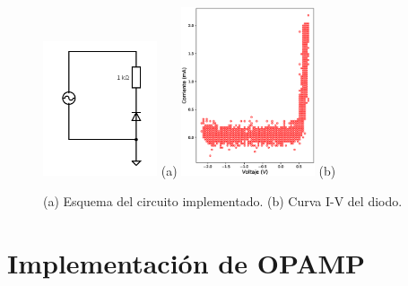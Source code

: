 \documentclass[a4paper,10pt]{article}
\begin{document}
\begin{figure}
 \centering
 \includegraphics[trim={0 0 1cm 0},clip, width=0.3\textwidth]{circuit.png} (a)
 \hspace{0.1cm}
 \includegraphics[width=0.35\textwidth]{diodo.eps} (b)
 \label{fig:diodo}
 \caption{(a) Esquema del circuito implementado. (b) Curva I-V del diodo.}
\end{figure}


\section{Implementación de OPAMP}
\label{sec:opamp}
\end{document}
